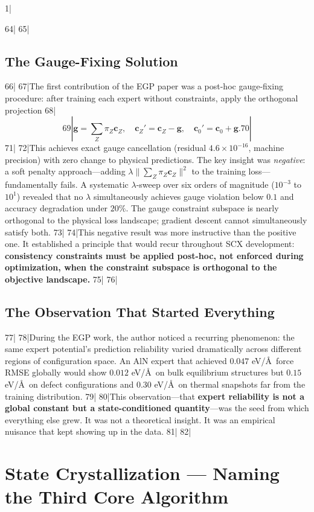 1|\documentclass[12pt,a4paper]{article}
\begin{document}
64|
65|\subsection{The Gauge-Fixing Solution}
66|
67|The first contribution of the EGP paper was a post-hoc gauge-fixing procedure: after training each expert without constraints, apply the orthogonal projection
68|\[
69|\mathbf{g} = \sum_Z \pi_Z \mathbf{c}_Z, \quad \mathbf{c}_Z' = \mathbf{c}_Z - \mathbf{g}, \quad \mathbf{c}_0' = \mathbf{c}_0 + \mathbf{g}.
70|\]
71|
72|This achieves exact gauge cancellation (residual $4.6\times10^{-16}$, machine precision) with zero change to physical predictions. The key insight was \textit{negative}: a soft penalty approach—adding $\lambda\lVert\sum_Z\pi_Z\mathbf{c}_Z\rVert^2$ to the training loss—fundamentally fails. A systematic $\lambda$-sweep over six orders of magnitude ($10^{-3}$ to $10^1$) revealed that no $\lambda$ simultaneously achieves gauge violation below $0.1$ and accuracy degradation under $20\%$. The gauge constraint subspace is nearly orthogonal to the physical loss landscape; gradient descent cannot simultaneously satisfy both.
73|
74|This negative result was more instructive than the positive one. It established a principle that would recur throughout SCX development: \textbf{consistency constraints must be applied post-hoc, not enforced during optimization, when the constraint subspace is orthogonal to the objective landscape.}
75|
76|\subsection{The Observation That Started Everything}
77|
78|During the EGP work, the author noticed a recurring phenomenon: the same expert potential's prediction reliability varied dramatically across different regions of configuration space. An AlN expert that achieved $0.047$ eV/\AA\ force RMSE globally would show $0.012$ eV/\AA\ on bulk equilibrium structures but $0.15$ eV/\AA\ on defect configurations and $0.30$ eV/\AA\ on thermal snapshots far from the training distribution.
79|
80|This observation—that \textbf{expert reliability is not a global constant but a state-conditioned quantity}—was the seed from which everything else grew. It was not a theoretical insight. It was an empirical nuisance that kept showing up in the data.
81|
82|\section{State Crystallization — Naming the Third Core Algorithm}
\end{document}
